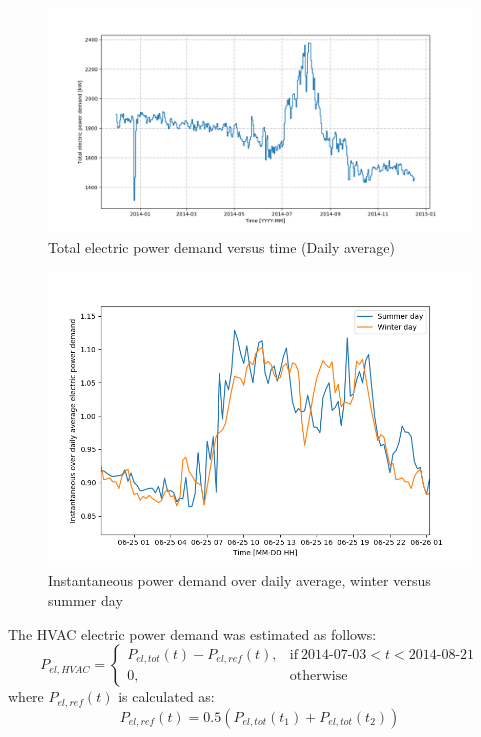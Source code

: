 \documentclass[preprint,12pt]{elsarticle}
\begin{document}
\begin{figure}
	\centering
	\includegraphics[width=0.9\linewidth]{Figures/Pel_vs_time}
	\caption[Total electric power demand versus time (Daily average)]{Total electric power demand versus time (Daily average)}
	\label{fig:pelvstime}
\end{figure}

\begin{figure}
	\centering
	\includegraphics[width=0.9\linewidth]{Figures/PelRel_vs_time}
	\caption{Instantaneous power demand over daily average, winter versus summer day}
	\label{fig:pelrelvstime}
\end{figure}

The HVAC electric power demand was estimated as follows:
\begin{equation}
P_{el,HVAC} =
\begin{cases}
P_{el,tot}(t) - P_{el,ref}(t) , & \text{if}\ \text{2014-07-03} < t < \text{2014-08-21} \\
0, & \text{otherwise}
\end{cases}
\end{equation}
where $P_{el,ref}(t)$ is calculated as:
\begin{equation}
P_{el,ref}(t) = 0.5 (P_{el,tot}(t_1) + P_{el,tot}(t_2))
\end{equation}
\end{document}
